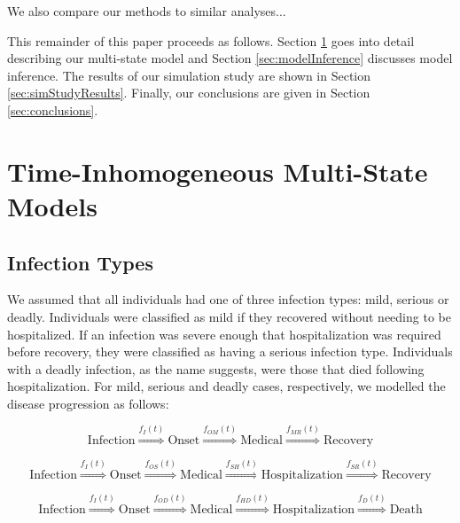 \documentclass[12pt]{article}
\begin{document}
We also compare our methods to similar analyses...


This remainder of this paper proceeds as follows.  Section \ref{sec:multiStateModel} goes into detail describing our multi-state model and Section \ref{sec:modelInference}
discusses model inference.  The results of our simulation study are shown in Section \ref{sec:simStudyResults}.  Finally, our conclusions
are given in Section \ref{sec:conclusions}.  


\section{Time-Inhomogeneous Multi-State Models}
\label{sec:multiStateModel}

\subsection{Infection Types}
\label{subsec:InfectionTypes}

We assumed that all individuals had one of three infection types:
mild, serious or deadly.  Individuals were classified as mild if
they recovered without needing to be hospitalized.  If an infection
was severe enough that hospitalization was required before recovery,
they were classified as having a serious infection type. Individuals
with a deadly infection, as the name suggests, were those that died
following hospitalization. For mild, serious and deadly cases,
respectively, we modelled the disease progression as follows:

\begin{equation}
\mbox{Infection} \stackrel{f_I(t)}{\Longrightarrow} \mbox{Onset} \stackrel{f_{OM}(t)}{\Longrightarrow} \mbox{Medical}  \stackrel{f_{MR}(t)}{\Longrightarrow} \mbox{Recovery} \label{eq:mildProgress}
\end{equation}

\begin{equation}
\mbox{Infection} \stackrel{f_I(t)}{\Longrightarrow} \mbox{Onset} \stackrel{f_{OS}(t)}{\Longrightarrow} \mbox{Medical} \stackrel{f_{SH}(t)}{\Longrightarrow} \mbox{Hospitalization} \stackrel{f_{SR}(t)}{\Longrightarrow} \mbox{Recovery} \label{eq:seriousProgress}
\end{equation}

\begin{equation}
\mbox{Infection} \stackrel{f_I(t)}{\Longrightarrow} \mbox{Onset} \stackrel{f_{OD}(t)}{\Longrightarrow} \mbox{Medical} \stackrel{f_{HD}(t)}{\Longrightarrow} \mbox{Hospitalization} \stackrel{f_{D}(t)}{\Longrightarrow} \mbox{Death}
\label{eq:deadlyProgress}
\end{equation}
\end{document}
